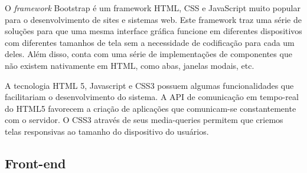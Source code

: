 O \emph{framework} Bootstrap é um framework HTML, CSS e JavaScript muito popular para o desenvolvimento de sites e sistemas web. Este framework traz uma série de soluções para que uma mesma interface gráfica funcione em diferentes dispositivos com diferentes tamanhos de tela sem a necessidade de codificação para cada um deles. Além disso, conta com uma série de implementações de componentes que não existem nativamente em HTML, como abas, janelas modais, etc.



\iffalse

A tecnologia HTML 5, Javascript e CSS3 possuem algumas funcionalidades que facilitariam o desenvolvimento do sistema. A API de comunicação em tempo-real do HTML5 favorecem a criação de aplicações que comunicam-se constantemente com o servidor. O CSS3 através de seus media-queries permitem que criemos telas responsivas ao tamanho do dispositivo do usuários.


\subsection{Front-end}
\label{sec:tecnologias_frontend}



